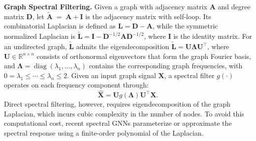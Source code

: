 \noindent \textbf{Graph Spectral Filtering.}
Given a graph with adjacency matrix $\boldsymbol{A}$ and degree matrix
$\boldsymbol{D}$,
let $\tilde{\bm A} \;=\; \bm A + \bm I$ is the adjacency matrix with self-loop.
Its combinatorial Laplacian is defined as
$\boldsymbol{L}=\boldsymbol{D}-\boldsymbol{A}$, while the symmetric normalized Laplacian is $\tilde{\boldsymbol{L}} =\boldsymbol{I}-\boldsymbol{D}^{-1/2}\boldsymbol{A}\boldsymbol{D}^{-1/2}$, where $\boldsymbol{I}$ is the identity matrix.
For an undirected graph, $\tilde{\boldsymbol{L}}$ admits the eigendecomposition
$\tilde{\boldsymbol{L}} =\boldsymbol{U}\boldsymbol{\Lambda}\boldsymbol{U}^{\top}$, where $\boldsymbol{U}\in\mathbb{R}^{n\times n}$ consists of orthonormal
eigenvectors that form the graph Fourier basis, and
$\boldsymbol{\Lambda}
=\operatorname{diag}(\lambda_1,\ldots,\lambda_n)$
contains the corresponding graph frequencies, with
$0=\lambda_1\leq\cdots\leq\lambda_n\leq 2$.
Given an input graph signal $\boldsymbol{X}$, a spectral filter $g(\cdot)$ operates on each frequency component through:
\begin{equation}
\boldsymbol{\hat X}
=
\boldsymbol{U}g(\boldsymbol{\Lambda})
\boldsymbol{U}^{\top}\boldsymbol{X}.    
\end{equation}
Direct spectral filtering, however, requires eigendecomposition of the graph Laplacian, which incurs cubic complexity in the number of nodes.
To avoid this computational cost, recent spectral GNNs \citep{BernNet, ChebNet2} parameterize or approximate the spectral response using a finite-order polynomial of the Laplacian.

